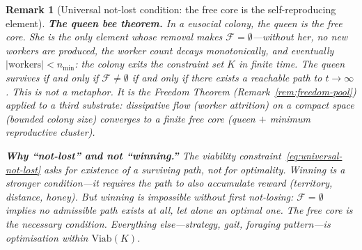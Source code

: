 \documentclass[11pt,a4paper]{article}
\newtheorem{remark}[theorem]{Remark}
\newcommand{\cF}{\mathcal{F}}
\begin{document}
\begin{remark}[Universal not-lost condition:
  the free core is the self-reproducing element]
\medskip\noindent
\textbf{The queen bee theorem.}\;
In a eusocial colony, the queen is the free core.
She is the only element whose removal makes
$\cF = \emptyset$---without her,
no new workers are produced,
the worker count decays monotonically,
and eventually $|\text{workers}| < n_{\min}$:
the colony exits the constraint set $K$ in finite time.
The queen survives if and only if
$\cF \neq \emptyset$
if and only if
there exists a reachable path to $t \to \infty$.
This is not a metaphor.
It is the Freedom Theorem
(Remark~\ref{rem:freedom-pool})
applied to a third substrate:
dissipative flow
(worker attrition)
on a compact space
(bounded colony size)
converges to a finite free core
(queen $+$ minimum reproductive cluster).

\medskip\noindent
\textbf{Why ``not-lost'' and not ``winning.''}\;
The viability constraint~\eqref{eq:universal-not-lost}
asks for \emph{existence} of a surviving path,
not for optimality.
Winning is a stronger condition---it requires
the path to also accumulate reward
(territory, distance, honey).
But winning is impossible without first not-losing:
$\cF = \emptyset$ implies no admissible path exists
at all, let alone an optimal one.
The free core is the necessary condition.
Everything else---strategy, gait, foraging
pattern---is optimisation \emph{within}
$\mathrm{Viab}(K)$.
\end{remark}
\end{document}
